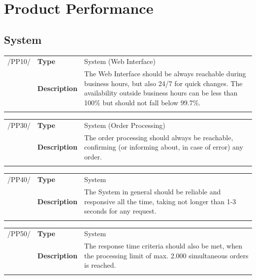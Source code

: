 \documentclass[11pt,a4paper,oneside,svgnames]{report}
\begin{document}
\chapter{Product Performance}
\section{System}
\noindent
\begin{tabular}{llp{10cm}}
\cellcolor{white}/PP10/	& \textbf{Type}			& System (Web Interface)\\
\cellcolor{white}		& \textbf{Description}	& The Web Interface should be always reachable during business hours, but also 24/7 for quick changes. The availability outside business hours can be less than 100\% but should not fall below 99.7\%.\\
\cellcolor{white}		\hfill \\
\end{tabular}

\noindent
\begin{tabular}{llp{10cm}}
\cellcolor{white}/PP30/	& \textbf{Type}			& System (Order Processing)\\
\cellcolor{white}		& \textbf{Description}	& The order processing should always be reachable, confirming (or informing about, in case of error) any order.\\
\cellcolor{white}		\hfill \\
\end{tabular}

\noindent
\begin{tabular}{llp{10cm}}
\cellcolor{white}/PP40/	& \textbf{Type}			& System\\
\cellcolor{white}		& \textbf{Description}	& The System in general should be reliable and responsive all the time, taking not longer than 1-3 seconds for any request.\\
\cellcolor{white}		\hfill \\
\end{tabular}

\noindent
\begin{tabular}{llp{10cm}}
\cellcolor{white}/PP50/	& \textbf{Type}			& System\\
\cellcolor{white}		& \textbf{Description}	& The response time criteria should also be met, when the processing limit of max. 2.000 simultaneous orders is reached.\\
\cellcolor{white}		\hfill \\
\end{tabular}
\end{document}
